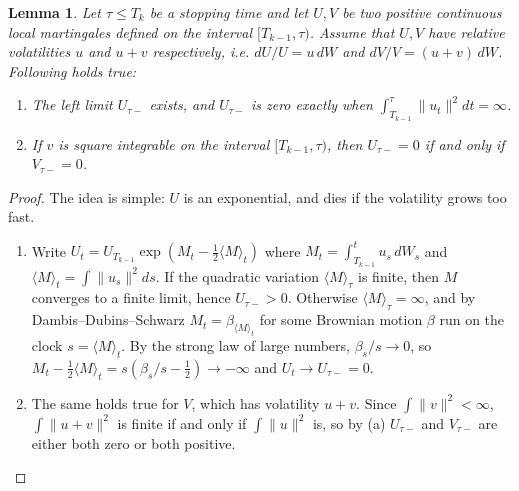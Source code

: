 \documentclass[11pt]{article}
\theoremstyle{plain}
\newtheorem{lemma}[theorem]{Lemma}
\theoremstyle{definition}
\theoremstyle{remark}
\begin{document}
\begin{lemma}
\label{lem:zero_sets_bh}  
Let $\tau\le T_k$ be a stopping time and let $U, V$ be two positive continuous local martingales defined on the interval $[T_{k-1},\tau)$. Assume that $U, V$ have relative volatilities $u$ and $u+v$ respectively, i.e. $dU / U = u \,dW$ and $dV / V = (u+v) \, dW$. Following holds true: 
\begin{enumerate}[label=(\alph*)]
  \item The left limit $U_{\tau-}$ exists, and $U_{\tau-}$ is zero exactly when $\int_{T_{k-1}}^{\tau} \| u_t \|^2 dt = \infty $.
  \item If $v$ is square integrable on the interval $[T_{k-1}, \tau)$, then $U_{\tau-}=0$ if and only if $V_{\tau-}=0$.
\end{enumerate}
\end{lemma}
\begin{proof}
  The idea is simple: $U$ is an exponential, and dies if the volatility grows too fast. 
  \begin{enumerate}[label=(\alph*)]
    \item Write $U_t = U_{T_{k-1}}\exp(M_t - \frac{1}{2}\langle M \rangle_t)$ where $M_t=\int_{T_{k-1}}^t u_s\,dW_s$ and $\langle M\rangle_t=\int\|u_s\|^2ds$. If the quadratic variation $\langle M \rangle_\tau$ is finite, then $M$ converges to a finite limit, hence $U_{\tau-}>0$. Otherwise $\langle M\rangle_\tau=\infty$, and by Dambis--Dubins--Schwarz $M_t = \beta_{\langle M \rangle_t}$ for some Brownian motion $\beta$ run on the clock $s = \langle M \rangle_t$. By the strong law of large numbers, $\beta_s/s\to0$, so $M_t-\frac12\langle M\rangle_t=s(\beta_s/s-\frac12)\to-\infty$ and $U_t \to U_{\tau-} = 0$. 
    \item The same holds true for $V$, which has volatility $u+v$. Since $\int\|v\|^2<\infty$, $\int\|u+v\|^2$ is finite if and only if $\int\|u\|^2$ is, so by (a) $U_{\tau-}$ and $V_{\tau-}$ are either both zero or both positive. 
  \end{enumerate}
\end{proof}
\end{document}
